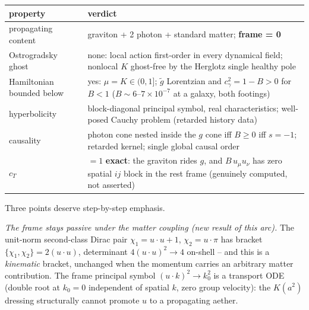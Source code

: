 \documentclass[
]{article}
\newcounter{none} %
\begin{document}
{\def\LTcaptype{none} %
\begin{longtable}[]{@{}
  >{\raggedright\arraybackslash}p{}
  >{\raggedright\arraybackslash}p{}@{}}
\toprule\noalign{}
\begin{minipage}[b]{\linewidth}\raggedright
property
\end{minipage} & \begin{minipage}[b]{\linewidth}\raggedright
verdict
\end{minipage} \\
\midrule\noalign{}
\endhead
\bottomrule\noalign{}
\endlastfoot
propagating content & 2 graviton + 2 photon + standard matter;
\textbf{frame = 0} \\
Ostrogradsky ghost & none: local action first-order in every dynamical
field; nonlocal \(K\) ghost-free by the Herglotz single healthy pole \\
Hamiltonian bounded below & yes: \(\mu = K \in (0,1]\); \(\tilde g\)
Lorentzian and \(c_\gamma^2 = 1-B > 0\) for \(B < 1\)
(\(B \sim 6\)--\(7 \times 10^{-7}\) at a galaxy, both footings) \\
hyperbolicity & block-diagonal principal symbol, real characteristics;
well-posed Cauchy problem (retarded history data) \\
causality & photon cone nested inside the \(g\) cone iff \(B \ge 0\) iff
\(s = -1\); retarded kernel; single global causal order \\
\(c_T\) & \(= 1\) \textbf{exact}: the graviton rides \(g\), and
\(B\, u_\mu u_\nu\) has zero spatial \(ij\) block in the rest frame
(genuinely computed, not asserted) \\
\end{longtable}
}

Three points deserve step-by-step emphasis.

\emph{The frame stays passive under the matter coupling (new result of
this arc).} The unit-norm second-class Dirac pair
\(\chi_1 = u \cdot u + 1\), \(\chi_2 = u \cdot \pi\) has bracket
\(\{\chi_1, \chi_2\} = 2(u \cdot u)\), determinant
\(4(u \cdot u)^2 \to 4\) on-shell -- and this is a \emph{kinematic}
bracket, unchanged when the momentum carries an arbitrary matter
contribution. The frame principal symbol \((u \cdot k)^2 \to k_0^2\) is
a transport ODE (double root at \(k_0 = 0\) independent of spatial
\(k\), zero group velocity): the \(K(a^2)\) dressing structurally cannot
promote \(u\) to a propagating aether.
\end{document}
